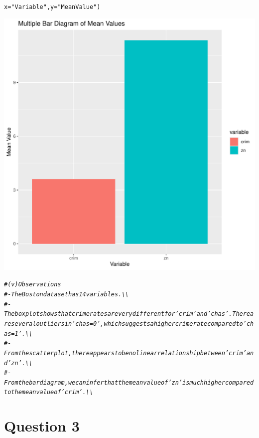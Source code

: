 \documentclass{article}\usepackage[]{graphicx}\usepackage[]{xcolor}
\makeatletter
\def\maxwidth{ %
  \ifdim\Gin@nat@width>\linewidth
    \linewidth
  \else
    \Gin@nat@width
  \fi
}
\newcommand{\hlsng}[1]{\textcolor[rgb]{0.192,0.494,0.8}{#1}}%
\newcommand{\hlcom}[1]{\textcolor[rgb]{0.678,0.584,0.686}{\textit{#1}}}%
\newcommand{\hldef}[1]{\textcolor[rgb]{0.345,0.345,0.345}{#1}}%
\newcommand{\hlkwc}[1]{\textcolor[rgb]{0.333,0.667,0.333}{#1}}%
\newenvironment{kframe}{%
 \def\at@end@of@kframe{}%
 \ifinner\ifhmode%
  \def\at@end@of@kframe{\end{minipage}}%
  \begin{minipage}{\columnwidth}%
 \fi\fi%
 \def\FrameCommand##1{\hskip\@totalleftmargin \hskip-\fboxsep
 \colorbox{shadecolor}{##1}\hskip-\fboxsep
     \hskip-\linewidth \hskip-\@totalleftmargin \hskip\columnwidth}%
 \MakeFramed {\advance\hsize-\width
   \@totalleftmargin\z@ \linewidth\hsize
   \@setminipage}}%
 {\par\unskip\endMakeFramed%
 \at@end@of@kframe}
\newenvironment{knitrout}{}{} %
\makeatother
\begin{document}
\begin{knitrout}
\begin{kframe}
\begin{alltt}
       \hlkwc{x} \hldef{=} \hlsng{"Variable"}\hldef{,} \hlkwc{y} \hldef{=} \hlsng{"Mean Value"}\hldef{)}
\end{alltt}
\end{kframe}
\includegraphics[width=\maxwidth]{figure/unnamed-chunk-2-3} 
\begin{kframe}\begin{alltt}
\hlcom{# (v) Observations}
\hlcom{# - The Boston dataset has 14 variables.\textbackslash{}\textbackslash{}}
\hlcom{# - The boxplot shows that crime rates are very different for 'crim' and 'chas'. There are several outliers in 'chas=0', which suggests a higher crime rate compared to 'chas=1'.\textbackslash{}\textbackslash{}}
\hlcom{# - From the scatter plot, there appears to be no linear relationship between 'crim' and 'zn'.\textbackslash{}\textbackslash{}}
\hlcom{# - From the bar diagram, we can infer that the mean value of 'zn' is much higher compared to the mean value of 'crim'.\textbackslash{}\textbackslash{}}
\end{alltt}
\end{kframe}
\end{knitrout}

\section{Question 3}
\end{document}
